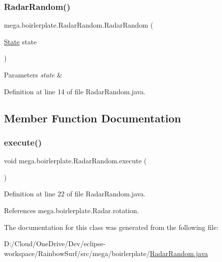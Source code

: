 \subsubsection{\texorpdfstring{Radar\+Random()}{RadarRandom()}}
{\footnotesize\ttfamily mega.\+boirlerplate.\+Radar\+Random.\+Radar\+Random (\begin{DoxyParamCaption}\item[{\hyperlink{classmega_1_1boirlerplate_1_1_state}{State}}]{state }\end{DoxyParamCaption})}


\begin{DoxyParams}{Parameters}
{\em state} & \\
\hline
\end{DoxyParams}


Definition at line 14 of file Radar\+Random.\+java.



\subsection{Member Function Documentation}
\mbox{\label{classmega_1_1boirlerplate_1_1_radar_random_ab0ae150efd7520d39df919a9a2837c65}} 
\subsubsection{\texorpdfstring{execute()}{execute()}}
{\footnotesize\ttfamily void mega.\+boirlerplate.\+Radar\+Random.\+execute (\begin{DoxyParamCaption}{ }\end{DoxyParamCaption})}



Definition at line 22 of file Radar\+Random.\+java.



References mega.\+boirlerplate.\+Radar.\+rotation.



The documentation for this class was generated from the following file\+:\begin{DoxyCompactItemize}
\item 
D\+:/\+Cloud/\+One\+Drive/\+Dev/eclipse-\/workspace/\+Rainbow\+Surf/src/mega/boirlerplate/\hyperlink{_radar_random_8java}{Radar\+Random.\+java}\end{DoxyCompactItemize}
